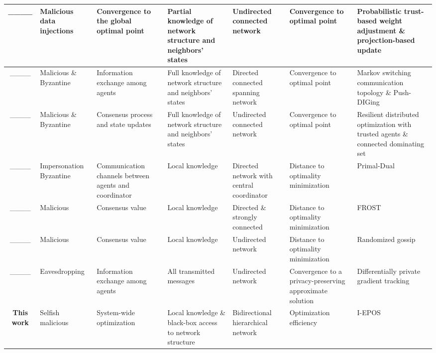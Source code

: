 \begin{table*}[htbp]
\begin{adjustbox}{width=\textwidth}
\begin{tabular}{cp{1.5cm}p{1.5cm}p{3.5cm}p{2.5cm}p{2.5cm}p{3cm}}
      \midrule
      ____ & Malicious data injections & Convergence to the global optimal point & Partial knowledge of network structure and neighbors' states & Undirected connected network & Convergence to optimal point & Probabilistic trust-based weight adjustment \& projection-based update \\
      \midrule
      ____ & Malicious \& Byzantine & Information exchange among agents & Full knowledge of network structure and neighbors' states & Directed connected spanning network & Convergence to optimal point & Markov switching communication topology \& Push-DIGing \\
      \midrule
      ____ & Malicious \& Byzantine & Consensus process and state updates & Full knowledge of network structure and neighbors' states & Undirected connected network & Convergence to optimal point & Resilient distributed optimization with trusted agents \& connected dominating set \\
      \midrule
      ____ & Impersonation Byzantine & Communication channels between agents and coordinator & Local knowledge & Directed network with central coordinator & Distance to optimality minimization & Primal-Dual \\
      \midrule
      ____ & Malicious & Consensus value & Local knowledge & Directed \& strongly connected & Distance to optimality minimization & FROST \\
      \midrule
      ____ & Malicious & Consensus value & Local knowledge & Undirected network & Distance to optimality minimization & Randomized gossip \\
      \midrule
      ____ & Eavesdropping & Information exchange among agents & All transmitted messages & Undirected network & Convergence to a privacy-preserving approximate solution & Differentially private gradient tracking  \\
    \midrule
      \textbf{This work} & Selfish malicious & System-wide optimization& Local knowledge \& black-box access to network structure & Bidirectional hierarchical network & Optimization efficiency & I-EPOS \\    
      \bottomrule
    \end{tabular} 
  \end{adjustbox}
  \label{t1}
\end{table*}

    
